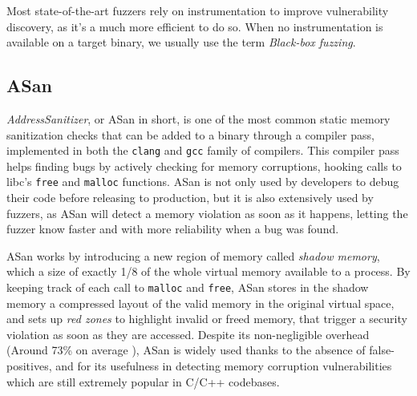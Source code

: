 \documentclass[a4paper,11pt,oneside]{report}
\newcommand{\todo}[1]{%
	\begingroup 
	\sethlcolor{cyan}%
	\hl{TODO: #1}%
	\endgroup
}
\begin{document}
Most state-of-the-art fuzzers rely on instrumentation to improve vulnerability 
discovery, as it's a much more efficient to do so. When no instrumentation is 
available on a target binary, we usually use the term \emph{Black-box fuzzing}. 

\subsection{ASan}
\emph{AddressSanitizer}, or ASan in short, is one of the most common static 
memory sanitization checks that can be added to a binary through a compiler 
pass, implemented in both the \texttt{clang} and \texttt{gcc} family of 
compilers. This compiler pass helps finding bugs by actively checking for 
memory corruptions, hooking calls to libc's  \texttt{free} and \texttt{malloc} 
functions. ASan is not only used by developers to debug their code before 
releasing to production, but it is also extensively used by fuzzers, as ASan 
will detect a memory violation as soon as it happens, letting the fuzzer know 
faster and with more reliability when a bug was found. 

ASan works by introducing a new region of memory called \emph{shadow memory}, 
which a size of exactly 1/8 of the whole virtual memory available to a process.
By keeping track of each call to \texttt{malloc} and \texttt{free}, ASan stores 
in the shadow memory a compressed layout of the valid memory in the original 
virtual space, and sets up \emph{red zones} to highlight invalid or freed 
memory, that trigger a security violation as soon as they are accessed. Despite 
its non-negligible overhead (Around 73\% on average \cite{asanoverhead}), ASan 
is widely used thanks to the absence of false-positives, and for its usefulness 
in detecting memory corruption vulnerabilities which are still extremely 
popular in C/C++ codebases.






\end{document}
